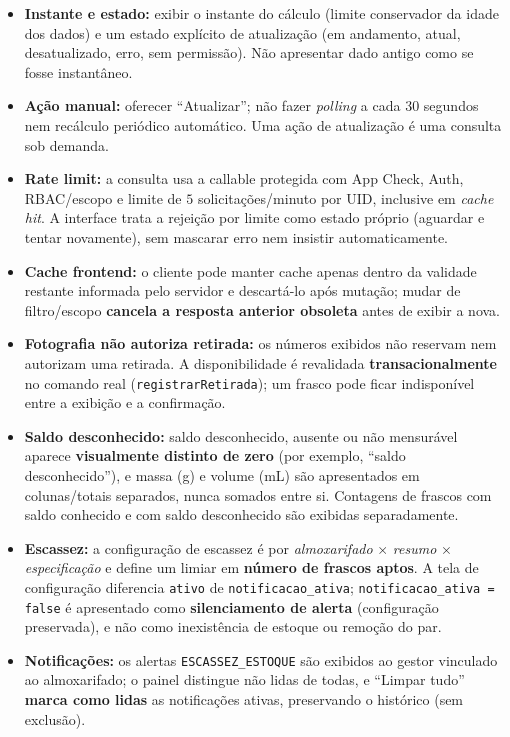 \begin{itemize}
    \item \textbf{Instante e estado:} exibir o instante do cálculo (limite conservador da idade dos dados) e um estado explícito de atualização (em andamento, atual, desatualizado, erro, sem permissão). Não apresentar dado antigo como se fosse instantâneo.
    \item \textbf{Ação manual:} oferecer ``Atualizar''; não fazer \textit{polling} a cada $30$ segundos nem recálculo periódico automático. Uma ação de atualização é uma consulta sob demanda.
    \item \textbf{Rate limit:} a consulta usa a callable protegida com App Check, Auth, RBAC/escopo e limite de $5$ solicitações/minuto por UID, inclusive em \textit{cache hit}. A interface trata a rejeição por limite como estado próprio (aguardar e tentar novamente), sem mascarar erro nem insistir automaticamente.
    \item \textbf{Cache frontend:} o cliente pode manter cache apenas dentro da validade restante informada pelo servidor e descartá-lo após mutação; mudar de filtro/escopo \textbf{cancela a resposta anterior obsoleta} antes de exibir a nova.
    \item \textbf{Fotografia não autoriza retirada:} os números exibidos não reservam nem autorizam uma retirada. A disponibilidade é revalidada \textbf{transacionalmente} no comando real (\texttt{registrarRetirada}); um frasco pode ficar indisponível entre a exibição e a confirmação.
    \item \textbf{Saldo desconhecido:} saldo desconhecido, ausente ou não mensurável aparece \textbf{visualmente distinto de zero} (por exemplo, ``saldo desconhecido''), e massa (g) e volume (mL) são apresentados em colunas/totais separados, nunca somados entre si. Contagens de frascos com saldo conhecido e com saldo desconhecido são exibidas separadamente.
    \item \textbf{Escassez:} a configuração de escassez é por \textit{almoxarifado} $\times$ \textit{resumo} $\times$ \textit{especificação} e define um limiar em \textbf{número de frascos aptos}. A tela de configuração diferencia \texttt{ativo} de \texttt{notificacao\_ativa}; \texttt{notificacao\_ativa = false} é apresentado como \textbf{silenciamento de alerta} (configuração preservada), e não como inexistência de estoque ou remoção do par.
    \item \textbf{Notificações:} os alertas \texttt{ESCASSEZ\_ESTOQUE} são exibidos ao gestor vinculado ao almoxarifado; o painel distingue não lidas de todas, e ``Limpar tudo'' \textbf{marca como lidas} as notificações ativas, preservando o histórico (sem exclusão).
\end{itemize}
